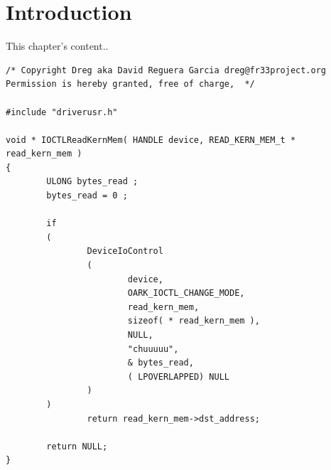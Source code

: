 \documentclass[12pt,a4paper,english]{book}
\begin{document}
\fancyhead{}
\fancyfoot{}
\fancyhead[LE,RO]{\slshape \rightmark}
\fancyfoot[C]{\thepage}
\tableofcontents

\newpage
\fancyhead[LE,RO]{\slshape \rightmark}
\fancyhead[LO,RE]{\slshape \leftmark}

\chapter{Introduction}
This chapter's content..


\lstset{language=C,caption=Descriptive Caption Text,label=DescriptiveLabels}
\begin{lstlisting}
/* Copyright Dreg aka David Reguera Garcia dreg@fr33project.org
Permission is hereby granted, free of charge,  */

#include "driverusr.h"

void * IOCTLReadKernMem( HANDLE device, READ_KERN_MEM_t * read_kern_mem )
{
        ULONG bytes_read ;
        bytes_read = 0 ;

        if
        (
                DeviceIoControl
                (
                        device,
                        OARK_IOCTL_CHANGE_MODE,
                        read_kern_mem,
                        sizeof( * read_kern_mem ),
                        NULL,
                        "chuuuuu",
                        & bytes_read,
                        ( LPOVERLAPPED) NULL
                )
        )
                return read_kern_mem->dst_address;

        return NULL;
}

\end{lstlisting}
\end{document}
